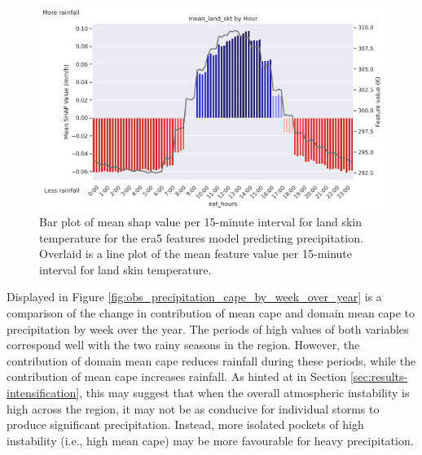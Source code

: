 \begin{figure}[ht]
    \centering
    \includegraphics[width=\textwidth]{../figures/generated/experiments/obs_precipitation/temporal_corr/obs_precipitation_era5_shap_mean_land_skt_by_hour.png}
    \caption{Bar plot of mean \acrshort{shap} value per 15-minute interval for land skin temperature for the \acrshort{era5} features model predicting precipitation. Overlaid is a line plot of the mean feature value per 15-minute interval for land skin temperature.}
    \label{fig:obs_precipitation_era5_shap_mean_land_skt_by_hour}
\end{figure}

Displayed in Figure \ref{fig:obs_precipitation_cape_by_week_over_year} is a comparison of the change in contribution of mean \acrshort{cape} and domain mean \acrshort{cape} to precipitation by week over the year. The periods of high values of both variables correspond well with the two rainy seasons in the region. However, the contribution of domain mean \acrshort{cape} reduces rainfall during these periods, while the contribution of mean \acrshort{cape} increases rainfall. As hinted at in Section \ref{sec:results-intensification}, this may suggest that when the overall atmospheric instability is high across the region, it may not be as conducive for individual storms to produce significant precipitation. Instead, more isolated pockets of high instability (i.e., high mean \acrshort{cape}) may be more favourable for heavy precipitation.

